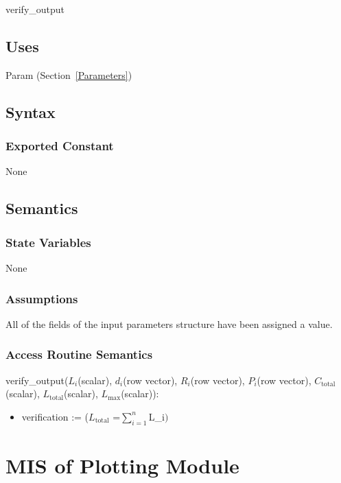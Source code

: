 \documentclass[12pt, titlepage]{article}
\begin{document}
verify\_output

\subsection{Uses}

Param (Section~\ref{Parameters})

\subsection{Syntax}

\subsubsection{Exported Constant}

None



\subsection{Semantics}

\subsubsection{State Variables}

None

\subsubsection{Assumptions}

All of the fields of the input parameters structure have been assigned a
value.  

\subsubsection{Access Routine Semantics}

\noindent verify\_output($L_i$(scalar), $d_i$(row vector), $R_i$(row vector), $P_i$(row vector), $C_\text{total}$(scalar), $L_\text{total}$(scalar), $L_\text{max}$(scalar)):
\begin{itemize}
\item verification := ($L_\text{total}$ =$\sum_{i=1}^{n} $L_i$)$
\end{itemize}


\newpage
\section{MIS of Plotting Module} \label{Plot}
\end{document}
